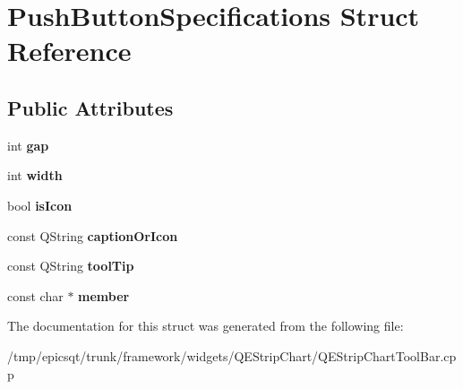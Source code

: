 \hypertarget{structPushButtonSpecifications}{
\section{PushButtonSpecifications Struct Reference}
\label{structPushButtonSpecifications}
}
\subsection*{Public Attributes}
\begin{DoxyCompactItemize}
\item 
\hypertarget{structPushButtonSpecifications_a6ef07b0a9665f9363f196ad801e711c0}{
int {\bfseries gap}}
\label{structPushButtonSpecifications_a6ef07b0a9665f9363f196ad801e711c0}

\item 
\hypertarget{structPushButtonSpecifications_adcd5b1dc5c4135c888588cc88d3a1c34}{
int {\bfseries width}}
\label{structPushButtonSpecifications_adcd5b1dc5c4135c888588cc88d3a1c34}

\item 
\hypertarget{structPushButtonSpecifications_a1b321fe30d17d9ed2d2b1c1dbe1a2231}{
bool {\bfseries isIcon}}
\label{structPushButtonSpecifications_a1b321fe30d17d9ed2d2b1c1dbe1a2231}

\item 
\hypertarget{structPushButtonSpecifications_ac434a07b988dda36f09e1a75c1b60fd9}{
const QString {\bfseries captionOrIcon}}
\label{structPushButtonSpecifications_ac434a07b988dda36f09e1a75c1b60fd9}

\item 
\hypertarget{structPushButtonSpecifications_a02c0792c6699a95b47a84b66d6169f33}{
const QString {\bfseries toolTip}}
\label{structPushButtonSpecifications_a02c0792c6699a95b47a84b66d6169f33}

\item 
\hypertarget{structPushButtonSpecifications_aacfd752969a3d5f6836bcf5de8561f34}{
const char $\ast$ {\bfseries member}}
\label{structPushButtonSpecifications_aacfd752969a3d5f6836bcf5de8561f34}

\end{DoxyCompactItemize}


The documentation for this struct was generated from the following file:\begin{DoxyCompactItemize}
\item 
/tmp/epicsqt/trunk/framework/widgets/QEStripChart/QEStripChartToolBar.cpp\end{DoxyCompactItemize}
